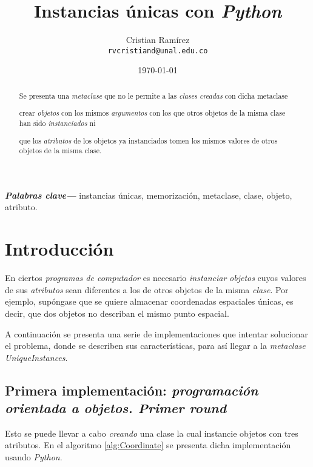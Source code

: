 \documentclass{article}
\title{Instancias únicas con \emph{Python}}
\author{Cristian Ramírez\\\texttt{rvcristiand@unal.edu.co}}
\date{\today}
\newenvironment{code}{\captionsetup{type=listing}}{}
\providecommand{\keywords}[1]{\textbf{\textit{Palabras clave---}} #1}
\begin{document}
	\maketitle
	\begin{abstract}
		Se presenta una \emph{metaclase} que no le permite a las \emph{clases} \emph{creadas} con dicha metaclase
		\begin{enumerate*}[label=\itshape\alph*\upshape)]
			\item crear \emph{objetos} con los mismos \emph{argumentos} con los que otros objetos de la misma clase han sido \emph{instanciados} ni
			\item que los \emph{atributos} de los objetos ya instanciados tomen los mismos valores de otros objetos de la misma clase.
		\end{enumerate*}
	\end{abstract}

	\keywords{instancias únicas, memorización, metaclase, clase, objeto, atributo}.

	\tableofcontents
	\listoflistings

	\section{Introducción}

	En ciertos \emph{programas de computador} es necesario \emph{instanciar} \emph{objetos} cuyos valores de sus \emph{atributos} sean diferentes a los de otros objetos de la misma \emph{clase}. Por ejemplo, supóngase que se quiere almacenar coordenadas espaciales únicas, es decir, que dos objetos no describan el mismo punto espacial.

	A continuación se presenta una serie de implementaciones que intentar solucionar el problema, donde se describen sus características, para así llegar a la \emph{metaclase} \emph{UniqueInstances}.

	\subsection{Primera implementación: \emph{programación orientada a objetos. \emph{Primer round}}}

	Esto se puede llevar a cabo \emph{creando} una clase la cual instancie objetos con tres atributos. En el algoritmo \ref{alg:Coordinate} se presenta dicha implementación usando \emph{Python}.
	\begin{code}
		\inputminted[firstline=1, lastline=5]{python}{coordinate.py}
		\label{alg:Coordinate}
	\end{code}
\end{document}
